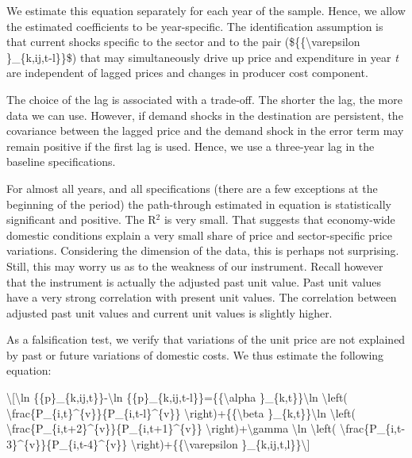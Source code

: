 \documentclass[12pt,twoside,a4paper,notitlepage]{article}
\begin{document}
We estimate this equation separately for each year of the sample. Hence, we allow the estimated coefficients to be year-specific. The identification assumption is that current shocks specific to the sector and to the pair (\$\{\{\textbackslash varepsilon \}\_\{k,ij,t-l\}\}\$) that may simultaneously drive up price and expenditure in year \textit{t} are independent of lagged prices and changes in producer cost component. 

The choice of the lag is associated with a trade-off. The shorter the lag, the more data we can use. However, if demand shocks in the destination are persistent, the covariance between the lagged price and the demand shock in the error term may remain positive if the first lag is used. Hence, we use a three-year lag in the baseline specifications.

For almost all years, and all specifications (there are a few exceptions at the beginning of the period) the path-through estimated in equation {\hyperref[ref-009]{ }} is statistically significant and positive. The R$^{2}$ is very small. That suggests that economy-wide domestic conditions explain a very small share of price and sector-specific price variations. Considering the dimension of the data, this is perhaps not surprising. Still, this may worry us as to the weakness of our instrument. Recall however that the instrument is actually the adjusted past unit value. Past unit values have a very strong correlation with present unit values. The correlation between adjusted past unit values and current unit values is slightly higher.

As a falsification test, we verify that variations of the unit price are not explained by past or future variations of domestic costs. We thus estimate the following equation:

\textbackslash [\textbackslash ln \{\{p\}\_\{k,ij,t\}\}-\textbackslash ln \{\{p\}\_\{k,ij,t-l\}\}=\{\{\textbackslash alpha \}\_\{k,t\}\}\textbackslash ln \textbackslash left( \textbackslash frac\{P\_\{i,t\}\textasciicircum{}\{v\}\}\{P\_\{i,t-l\}\textasciicircum{}\{v\}\} \textbackslash right)+\{\{\textbackslash beta \}\_\{k,t\}\}\textbackslash ln \textbackslash left( \textbackslash frac\{P\_\{i,t+2\}\textasciicircum{}\{v\}\}\{P\_\{i,t+1\}\textasciicircum{}\{v\}\} \textbackslash right)+\textbackslash gamma \textbackslash ln \textbackslash left( \textbackslash frac\{P\_\{i,t-3\}\textasciicircum{}\{v\}\}\{P\_\{i,t-4\}\textasciicircum{}\{v\}\} \textbackslash right)+\{\{\textbackslash varepsilon \}\_\{k,ij,t,l\}\}\textbackslash ] 
\end{document}
